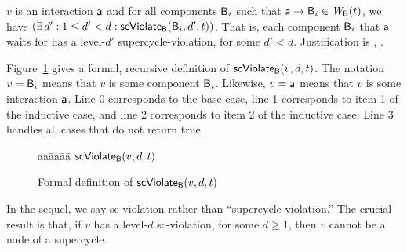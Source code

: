 \item \label{def:supercycle.violation.interaction.out}
$v$ is an interaction $\mathsf{a}$ and for all components $\mathsf{B}_i$ such that $\mathsf{a} \rightarrow \mathsf{B}_i \in \mathit{W}_{\mathsf{B}}({t})$, we have $(\exists\, d' : 1 \le d' < d: \mathsf{scViolate}_{\mathsf{B}}(\mathsf{B}_i,d',t))$.
That is, each component $\mathsf{B}_i$ that $\mathsf{a}$ waits for has a level-$d'$ supercycle-violation, for some $d' < d$.
Justification is , .

\en
\ed
%
Figure~\ref{fig:scViolate} gives a formal, recursive definition of $\mathsf{scViolate}_{\mathsf{B}}(v,d,t)$. 
The notation $v = \mathsf{B}_i$ means that $v$ is some component $\mathsf{B}_i$. Likewise, 
$v = \mathsf{a}$ means that $v$ is some interaction $\mathsf{a}$.
Line 0 corresponds to the base case, line 1 corresponds to item 1 of the inductive case, and line 2 corresponds to item 2 of the inductive case.
Line 3 handles all cases that do not return true.


\begin{figure}[t]
\setcounter{lctr}{-1}
\horline
\begin{tabbing}\label{alg:check-scViol}
aa\= aa\= aa\= \kill
$\mathsf{scViolate}_{\mathsf{B}}(v,d,t)$\\
\end{tabbing}
\vspace{-3ex}
\horline
\caption{Formal definition of $\mathsf{scViolate}_{\mathsf{B}}(v,d,t)$}
\label{fig:scViolate}
\end{figure}


In the sequel, we say sc-violation rather than ``supercycle violation.''  The crucial result is
that, if $v$ has a level-$d$ sc-violation, for some $d \ge 1$, then $v$ cannot be a node of a
supercycle.


